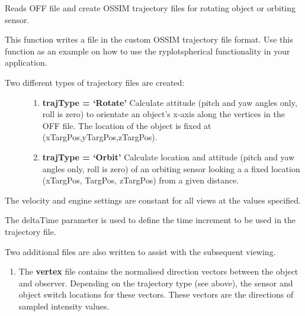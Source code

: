 \documentclass[a4paper,10pt,english]{sphinxmanual}
\begin{document}

\begin{fulllineitems}
\label{ryplotspherical:pyradi.ryplotspherical.writeOSSIMTrajOFFFile}
Reads OFF file and create OSSIM trajectory files for rotating object
or orbiting sensor.

This function writes a file in the custom OSSIM trajectory file format.
Use this function as an example on how to use the ryplotspherical
functionality in your application.
\begin{description}
\item[{Two different types of trajectory files are created:}] \leavevmode\begin{enumerate}
\item {} 
\textbf{trajType = `Rotate'}
Calculate attitude (pitch and yaw angles only, roll is zero) to
orientate an object's x-axis along the vertices in the OFF file.
The location of the object is fixed at (xTargPos,yTargPos,zTargPos).

\item {} 
\textbf{trajType = `Orbit'}
Calculate location and attitude (pitch and yaw angles only, roll is
zero) of an orbiting sensor looking a a fixed location
(xTargPos, TargPos, zTargPos) from a given distance.

\end{enumerate}

\end{description}

The velocity and engine settings are constant for all views at the
values specified.

The deltaTime parameter is used to define the time increment to be
used in the trajectory file.

Two additional files are also written to assist with the subsequent
viewing.
\begin{enumerate}
\item {} 
The \textbf{vertex} file contains the normalised direction vectors
between the object and observer. Depending on the trajectory type
(see above), the sensor and object switch locations for these
vectors. These vectors are the directions of sampled intensity values.


\end{enumerate}
\end{fulllineitems}
\end{document}

